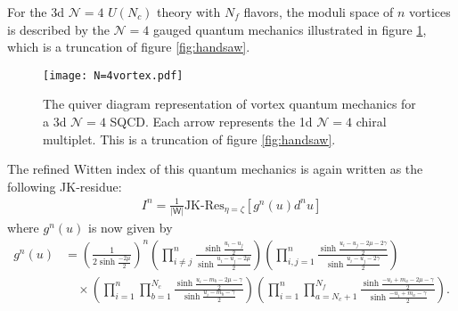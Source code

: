 \documentclass[a4paper,11pt]{article}
\begin{document}
For the 3d $\mathcal N = 4$ $U(N_c)$ theory with $N_f$ flavors, the moduli space of $n$ vortices is described by the $\mathcal N = 4$ gauged quantum mechanics illustrated in figure \ref{fig:N=4 vortex}, which is a truncation of figure \ref{fig:handsaw}.
%
\begin{figure}[tbp]
\centering %
\texttt{[image: N=4vortex.pdf]}
\caption{\label{fig:N=4 vortex} The quiver diagram representation of vortex quantum mechanics for a 3d $\mathcal N = 4$ SQCD. Each arrow represents the 1d $\mathcal N = 4$ chiral multiplet. This is a truncation of figure \ref{fig:handsaw}.}
\end{figure}
%
The refined Witten index of this quantum mechanics is again written as the following JK-residue:
\begin{align}
I^n = \frac{1}{|\mathsf W|} \text{JK-Res}_{\eta = \zeta} \left[g^n(u) d^n u\right]
\end{align}
where $g^n (u)$ is now given by
\begin{align}
\label{eq:N=4 1-loop}
%
g^n (u) &= \left(\frac{1}{2 \sinh \frac{-2 \mu}{2}}\right)^n \left(\prod_{i \neq j}^n \frac{\sinh \frac{u_i-u_j}{2}}{\sinh \frac{u_i-u_j-2 \mu}{2}}\right) \left(\prod_{i,j = 1}^n \frac{\sinh \frac{u_i-u_j-2 \mu-2 \gamma}{2}}{\sinh \frac{u_i-u_j-2 \gamma}{2}}\right) \nonumber \\
%
&\quad \times \left(\prod_{i = 1}^n \prod_{b = 1}^{N_c} \frac{\sinh \frac{u_i-m_b-2 \mu-\gamma}{2}}{\sinh \frac{u_i-m_b-\gamma}{2}}\right) \left(\prod_{i = 1}^n \prod_{a = N_c+1}^{N_f} \frac{\sinh \frac{-u_i+m_a-2 \mu-\gamma}{2}}{\sinh \frac{-u_i+m_a-\gamma}{2}}\right).
%
\end{align}
\end{document}
